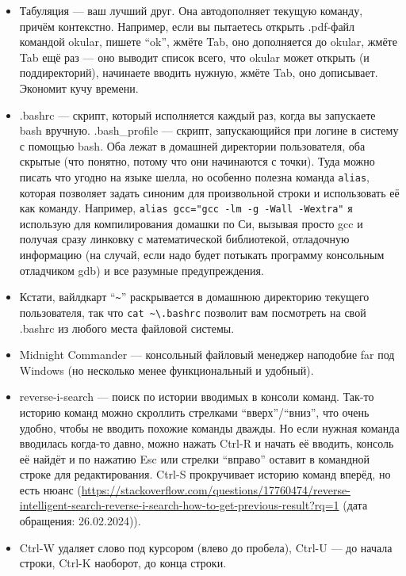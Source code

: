 \documentclass{../../text-style}
\begin{document}
\begin{itemize}
    \item Табуляция --- ваш лучший друг.
        Она автодополняет текущую команду, причём контекстно. 
        Например, если вы пытаетесь открыть .pdf-файл командой okular, пишете \enquote{ok}, жмёте Tab, оно дополняется до okular, жмёте Tab ещё раз --- оно выводит список всего, что okular может открыть (и поддиректорий), начинаете вводить нужную, жмёте Tab, оно дописывает.
        Экономит кучу времени.
    \item .bashrc --- скрипт, который исполняется каждый раз, когда вы запускаете bash вручную.
        .bash\_profile --- скрипт, запускающийся при логине в систему с помощью bash.
        Оба лежат в домашней директории пользователя, оба скрытые (что понятно, потому что они начинаются с точки).
        Туда можно писать что угодно на языке шелла, но особенно полезна команда \verb|alias|, которая позволяет задать синоним для произвольной строки и использовать её как команду.
        Например, \verb|alias gcc="gcc -lm -g -Wall -Wextra"| я использую для компилирования домашки по Си, вызывая просто gcc и получая сразу линковку с математической библиотекой, отладочную информацию (на случай, если надо будет потыкать программу консольным отладчиком gdb) и все разумные предупреждения.
    \item Кстати, вайлдкарт \enquote{\verb|~|} раскрывается в домашнюю директорию текущего пользователя, так что \verb|cat ~\.bashrc| позволит вам посмотреть на свой .bashrc из любого места файловой системы.
    \item Midnight Commander --- консольный файловый менеджер наподобие far под Windows (но несколько менее функциональный и удобный).
    \item reverse-i-search --- поиск по истории вводимых в консоли команд.
        Так-то историю команд можно скроллить стрелками \enquote{вверх}/\enquote{вниз}, что очень удобно, чтобы не вводить похожие команды дважды.
        Но если нужная команда вводилась когда-то давно, можно нажать Ctrl-R и начать её вводить, консоль её найдёт и по нажатию Esc или стрелки \enquote{вправо} оставит в командной строке для редактирования.
        Ctrl-S прокручивает историю команд вперёд, но есть нюанс (\url{https://stackoverflow.com/questions/17760474/reverse-intelligent-search-reverse-i-search-how-to-get-previous-result?rq=1} (дата обращения: 26.02.2024)).
    \item Ctrl-W удаляет слово под курсором (влево до пробела), Ctrl-U --- до начала строки, Ctrl-K наоборот, до конца строки.

\end{itemize}
\end{document}
